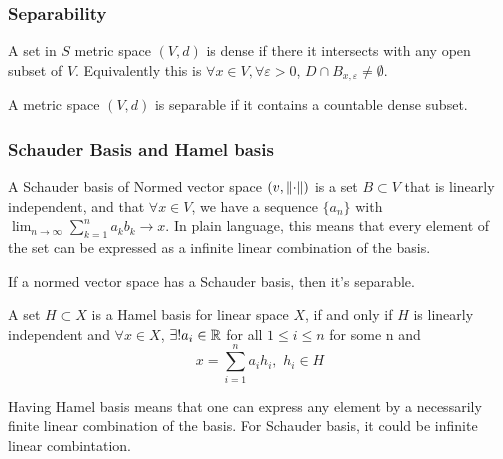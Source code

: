\subsubsection{Separability}

\begin{definition}[dense]\nl
	A set in $S$ metric space $(V,d)$ is dense if there it intersects with any open subset of $V$. Equivalently this is $\forall x\in V,\forall \varepsilon>0$, $D\cap B_{x,\varepsilon}\neq \emptyset$.
\end{definition}


\begin{definition}[separable]\nl
	A metric space $(V,d)$ is separable if it contains a countable dense subset.
\end{definition}
\begin{comment}
\begin{example}[separable space example]\label{separable space example}
\end{example}
\end{comment}
\subsubsection{Schauder Basis and Hamel basis}

\begin{definition}\label{Schauder basis}\nl
	A Schauder basis of Normed vector space $(v,\left\|{\cdot}\right\|)$ is a set $B\subset V$ that is linearly independent, and that $\forall x\in V$, we have a sequence $\{a_n\}$ with $\lim_{n\to\infty}\sum_{k=1}^n a_k b_k\to x$. In plain language, this means that every element of the set can be expressed as a infinite linear combination of the basis.
\end{definition}


\begin{proposition}\rm\nextline
	If a normed vector space has a Schauder basis, then it's separable.
\end{proposition}

\begin{definition}\rm\nextline
	A set $H\subset X$ is a Hamel basis for linear space $X$, if and only if $H$ is linearly independent and $\forall x\in X$, $\exists !a_i\in \mathbb{R}$ for all $1\leq i\leq n$ for some n and 
	$$
	x=\sum_{i=1}^n a_ih_i,\,\,h_i\in H
	$$
\end{definition}

\begin{remark}\rm\nextline
	Having Hamel basis means that one can express any element by a necessarily finite linear combination of the basis. For Schauder basis, it could be infinite linear combintation.
\end{remark}

